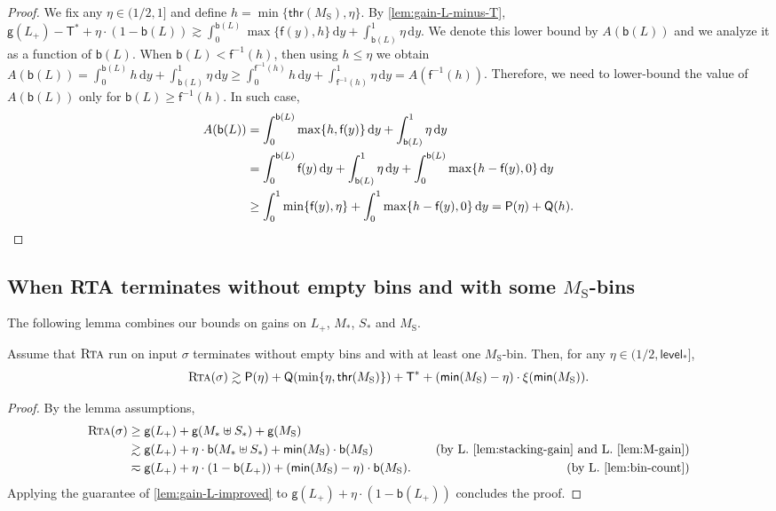 \documentclass[a4paper,USenglish,cleveref]{lipics-v2019}
\newcommand{\LG}{\ensuremath{L}\xspace}
\newcommand{\M}{\ensuremath{M_\mathrm{S}}\xspace}
\newcommand{\ST}{\ensuremath{S_*}\xspace}
\newcommand{\MT}{\ensuremath{M_*}\xspace}
\newcommand{\LT}{\ensuremath{L_+}\xspace}
\newcommand{\f}{\textsf{f}}
\newcommand{\g}{\ensuremath{\xi}}
\newcommand{\water}{\textsf{Q}}
\newcommand{\cutintegral}{\textsf{P}}
\newcommand{\B}{\textsf{b}}
\newcommand{\gain}{\textsf{g}}
\newcommand{\thresh}{\textsf{thr}(\M)}
\newcommand{\level}{\textsf{level}_*}
\newcommand{\mn}{\textsf{min}}
\newcommand{\T}{\textsf{T}}
\newcommand{\Tmax}{\T^*}
\newcommand{\dd}{\mathrm{d}}
\newcommand{\ALG}{\textsc{Rta}\xspace}
\begin{document}
\begin{proof}
We fix any $\eta \in (1/2,1]$ and define $h = \min\{ \thresh, \eta \}$. By
\cref{lem:gain-L-minus-T}, $\gain(\LT) - \Tmax + \eta \cdot (1-\B(\LG)) \gtrsim
\int_0^{\B(\LG)} \max\{ \f(y), h \} \, \dd y + \int_{\B(\LG)}^1 \eta \,\dd y$.
We denote this lower bound by $A(\B(\LG))$ and we analyze it as a function of
$\B(\LG)$. When $\B(\LG) < \f^{-1}(h)$, then using $h \leq \eta$ we obtain
$A(\B(\LG)) = \int_0^{\B(\LG)} h \, \dd y + \int_{\B(\LG)}^1 \eta \,\dd y \geq
\int_0^{\f^{-1}(h)} h \, \dd y + \int_{\f^{-1}(h)}^1 \eta \,\dd y =
A(\f^{-1}(h))$. Therefore, we need to lower-bound the value of $A(\B(\LG))$ only
for $\B(\LG) \geq \f^{-1}(h)$. In such case, 
\begin{align*}
  A(\B(\LG)) 
  & = \int_0^{\B(\LG)} \max\{ h, \f(y)\} \, \dd y + \int_{\B(\LG)}^1 \eta \,\dd y \\
  & = \int_0^{\B(\LG)} \f(y) \, \dd y + \int_{\B(\LG)}^1 \eta \,\dd y + \int_0^{\B(\LG)} \max\{ h - \f(y), 0 \} \, \dd y \\
  & \geq \int_0^1 \min \{ \f(y), \eta \} + \int_0^1 \max\{ h - \f(y), 0 \} \, \dd y 
  = \cutintegral(\eta) + \water(h). 
\qedhere
\end{align*}
\end{proof}

\subsection{When RTA terminates without empty bins and with some \texorpdfstring{\M-bins}{MS-bins}}

The following lemma combines our bounds on gains on $\LT$, $\MT$, $\ST$ and $\M$.

\begin{lemma}
\label{lem:helper-bound}
Assume that $\ALG$ run on input $\sigma$ terminates without empty bins and with at least one $\M$-bin.
Then, for any $\eta \in (1/2, \level]$,
\[
\ALG(\sigma) \gtrsim \cutintegral(\eta) + \water(\min\{\eta, \thresh\}) + \Tmax + 
(\mn(\M) - \eta) \cdot \g(\mn(\M)).
\]
\end{lemma}
  
\begin{proof}
By the lemma assumptions,
\begin{align*}
      \ALG(\sigma)
      & \geq \gain(\LT) + \gain(\MT \uplus \ST) + \gain(\M) \\
      & \gtrsim \gain(\LT) +  \eta \cdot \B(\MT \uplus \ST) + \mn(\M) \cdot \B(\M) 
        &&& \text{(by L.~\ref{lem:stacking-gain} and L.~\ref{lem:M-gain})} \\
      & \eqsim \gain(\LT) + \eta \cdot(1-\B(\LT))
        + (\mn(\M) - \eta) \cdot\B(\M). 
        &&& \text{(by L.~\ref{lem:bin-count})} 
\end{align*}
Applying the guarantee of \cref{lem:gain-L-improved} to $\gain(\LT) + \eta \cdot(1-\B(\LT))$
concludes the proof.
\end{proof}
\end{document}
